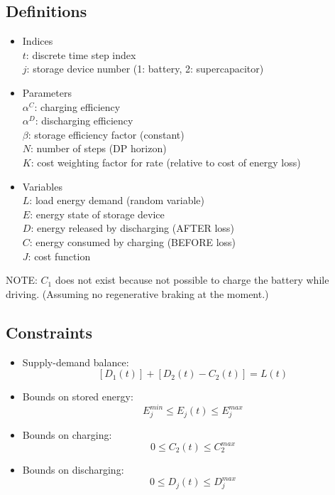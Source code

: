 \documentclass{article}
\begin{document}
	\subsection{Definitions}
	\begin{itemize}
		\item Indices\\
		$t$: discrete time step index\\
		$j$: storage device number (1: battery, 2: supercapacitor)\\
		\item Parameters\\
		$\alpha^{C}$: charging efficiency\\
		$\alpha^{D}$: discharging efficiency\\
		$\beta$: storage efficiency factor (constant)\\
		$N$: number of steps (DP horizon)\\
		$K$: cost weighting factor for rate (relative to cost of energy loss)\\
		\item Variables\\
		$L$: load energy demand (random variable)\\
		$E$: energy state of storage device\\
		$D$: energy released by discharging (AFTER loss)\\
		$C$: energy consumed by charging (BEFORE loss)\\
		$J$: cost function
	\end{itemize}
	
	NOTE: $C_{1}$ does not exist because not possible to charge the battery while driving. (Assuming no regenerative braking at the moment.)
	
	\subsection{Constraints}
	\begin{itemize}
		\item Supply-demand balance: 
		\begin{equation} \label{eq:BalanceEqn}\left[D_{1}(t)\right] + \left[D_{2}(t) - C_{2}(t)\right] = L(t) \end{equation}
		
		\item Bounds on stored energy: 
		\begin{equation}E_{j}^{min}\leq E_{j}(t)\leq E_{j}^{max}\end{equation}
		\item Bounds on charging:
		\begin{equation}0\leq C_{2}(t)\leq C_{2}^{max}\end{equation}
		\item Bounds on discharging:
		\begin{equation}0\leq D_{j}(t)\leq D_{j}^{max}\end{equation}
	\end{itemize}
	
\end{document}
